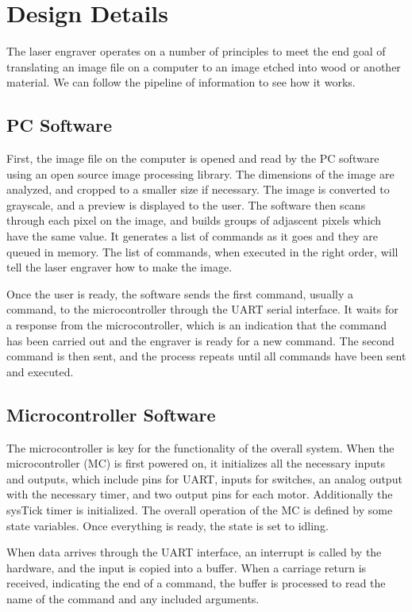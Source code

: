 \documentclass[11pt]{LaTeX-Classes/math-hw}
\begin{document}
\section{Design Details}
The laser engraver operates on a number of principles to meet the end goal of
translating an image file on a computer to an image etched into wood or another material.
We can follow the pipeline of information to see how it works.

\subsection{PC Software}
First, the image file on the computer is opened and read by the PC software using an open source
image processing library. The dimensions of the image are analyzed, and cropped to a smaller size
if necessary.
The image is converted to grayscale, and a preview is displayed to the user.
The software then scans through each pixel on the image, and builds groups of adjascent pixels
which have the same value. It generates a list of commands as it goes and they are queued in memory.
The list of commands, when executed in the right order, will tell the laser engraver how to make the image.

Once the user is ready, the software sends the first command, usually a  command, to the
microcontroller through the UART serial interface.
It waits for a response from the microcontroller, which is an indication that the command has been
carried out and the engraver is ready for a new command.
The second command is then sent, and the process repeats until all commands have been sent and executed.

\subsection{Microcontroller Software}
The microcontroller is key for the functionality of the overall system.
When the microcontroller (MC) is first powered on, it initializes all the necessary inputs and outputs,
which include pins for UART, inputs for switches, an analog output with the necessary timer,
and two output pins for each motor.
Additionally the sysTick timer is initialized. The overall operation of the MC is defined by some
state variables. Once everything is ready, the state is set to idling.

When data arrives through the UART interface, an interrupt is called by the hardware, and the
input is copied into a buffer. When a carriage return is received, indicating the end of a command,
the buffer is processed to read the name of the command and any included arguments.
\end{document}
